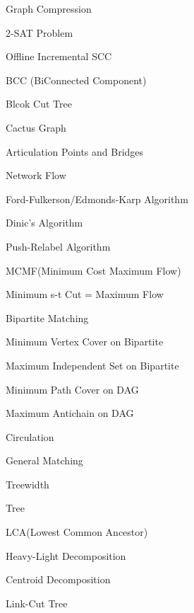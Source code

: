 \documentclass[landscape, 8pt, a4paper, oneside]{extarticle}
\begin{document}
\begin{multicols}{3}
\begin{tcolorbox}[breakable, enhanced, sharp corners, colback=white, colframe=black, boxrule=1pt, left=0pt]
\begin{IdeaNote}
\begin{IdeaNote}
\begin{IdeaNote}
            \begin{IdeaNote}
            \item Graph Compression
            \item 2-SAT Problem
            \item Offline Incremental SCC
            \end{IdeaNote}
        \item BCC (BiConnected Component)
            \begin{IdeaNote}
            \item Blcok Cut Tree
            \item Cactus Graph
            \end{IdeaNote}
        \item Articulation Points and Bridges
        \end{IdeaNote}
    \item Network Flow
        \begin{IdeaNote}
        \item Ford-Fulkerson/Edmonds-Karp Algorithm
        \item Dinic's Algorithm
        \item Push-Relabel Algorithm
        \item MCMF(Minimum Cost Maximum Flow)
        \item Minimum s-t Cut = Maximum Flow
        \item Bipartite Matching
            \begin{IdeaNote}
            \item Minimum Vertex Cover on Bipartite
            \item Maximum Independent Set on Bipartite
            \item Minimum Path Cover on DAG
            \item Maximum Antichain on DAG
            \end{IdeaNote}
        \item Circulation
        \item General Matching
        \end{IdeaNote}
    \item Treewidth
    \end{IdeaNote}
        
\item Tree
    \begin{IdeaNote}
    \item LCA(Lowest Common Ancestor)
    \item Heavy-Light Decomposition
    \item Centroid Decomposition
    \item Link-Cut Tree
    \end{IdeaNote}


\end{IdeaNote}
\end{tcolorbox}
\end{multicols}
\end{document}
